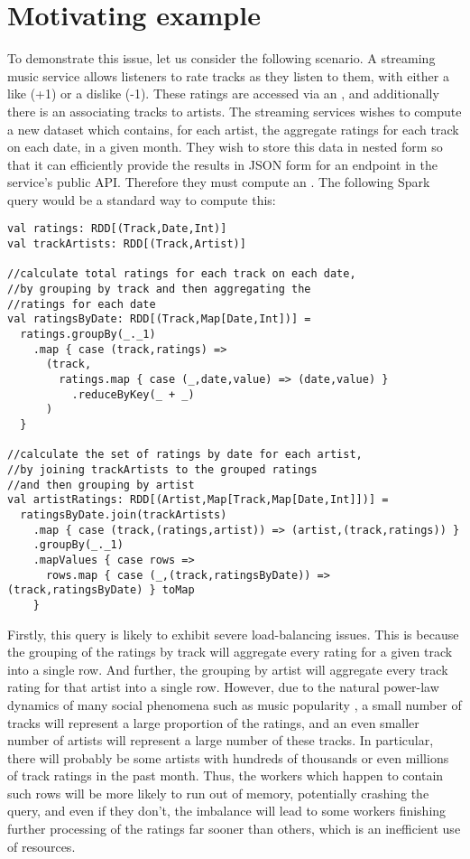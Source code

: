\section{Motivating example} {

To demonstrate this issue, let us consider the following scenario. A streaming music service allows listeners to rate tracks as they listen to them, with either a like (+1) or a dislike (-1). These ratings are accessed via an , and additionally there is an  associating tracks to artists. The streaming services wishes to compute a new dataset which contains, for each artist, the aggregate ratings for each track on each date, in a given month. They wish to store this data in nested form so that it can efficiently provide the results in JSON form for an endpoint in the service's public API. Therefore they must compute an . The following Spark query would be a standard way to compute this:

\vs\begin{lstlisting}
val ratings: RDD[(Track,Date,Int)]
val trackArtists: RDD[(Track,Artist)]

//calculate total ratings for each track on each date,
//by grouping by track and then aggregating the
//ratings for each date
val ratingsByDate: RDD[(Track,Map[Date,Int])] =
  ratings.groupBy(_._1)
    .map { case (track,ratings) =>
      (track,
        ratings.map { case (_,date,value) => (date,value) }
          .reduceByKey(_ + _)
      )
  }

//calculate the set of ratings by date for each artist,
//by joining trackArtists to the grouped ratings
//and then grouping by artist
val artistRatings: RDD[(Artist,Map[Track,Map[Date,Int]])] =
  ratingsByDate.join(trackArtists)
    .map { case (track,(ratings,artist)) => (artist,(track,ratings)) }
    .groupBy(_._1)
    .mapValues { case rows =>
      rows.map { case (_,(track,ratingsByDate)) => (track,ratingsByDate) } toMap
    }
\end{lstlisting}\vs

Firstly, this query is likely to exhibit severe load-balancing issues. This is because the grouping of the ratings by track will aggregate every rating for a given track into a single row. And further, the grouping by artist will aggregate every track rating for that artist into a single row. However, due to the natural power-law dynamics of many social phenomena such as music popularity \cite{musicpowerlaw}, a small number of tracks will represent a large proportion of the ratings, and an even smaller number of artists will represent a large number of these tracks. In particular, there will probably be some artists with hundreds of thousands or even millions of track ratings in the past month. Thus, the workers which happen to contain such rows will be more likely to run out of memory, potentially crashing the query, and even if they don't, the imbalance will lead to some workers finishing further processing of the ratings far sooner than others, which is an inefficient use of resources.

}
